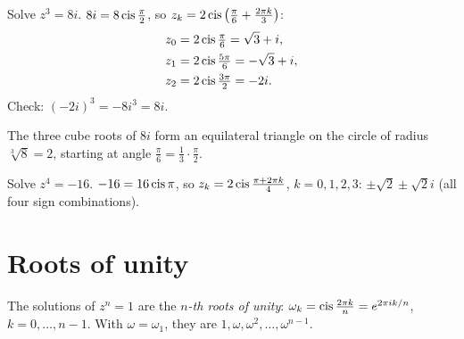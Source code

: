 \begin{example}
Solve $z^3 = 8i$. $8i = 8\operatorname{cis}\frac\pi2$, so $z_k = 2\operatorname{cis}\left(\frac\pi6 + \frac{2\pi k}{3}\right)$:
\begin{align*}
z_0 &= 2\operatorname{cis}\tfrac\pi6 = \sqrt3 + i,\\
z_1 &= 2\operatorname{cis}\tfrac{5\pi}6 = -\sqrt3 + i,\\
z_2 &= 2\operatorname{cis}\tfrac{3\pi}2 = -2i.
\end{align*}
Check: $(-2i)^3 = -8i^3 = 8i$.
\end{example}

\begin{center}
\end{center}
The three cube roots of $8i$ form an equilateral triangle on the circle of radius
$\sqrt[3]8 = 2$, starting at angle $\frac\pi6 = \frac13\cdot\frac\pi2$.

\begin{example}
Solve $z^4 = -16$. $-16 = 16\operatorname{cis}\pi$, so $z_k = 2\operatorname{cis}\frac{\pi + 2\pi k}{4}$, $k = 0,1,2,3$:
$\pm\sqrt2 \pm\sqrt2 i$ (all four sign combinations).
\end{example}

\section{Roots of unity}

\begin{definition}
The solutions of $z^n = 1$ are the \emph{$n$-th roots of unity}:
$\omega_k = \operatorname{cis}\frac{2\pi k}{n} = e^{2\pi i k/n}$, $k = 0,\dots,n-1$. With
$\omega = \omega_1$, they are $1, \omega, \omega^2, \dots,\omega^{n-1}$.
\end{definition}


